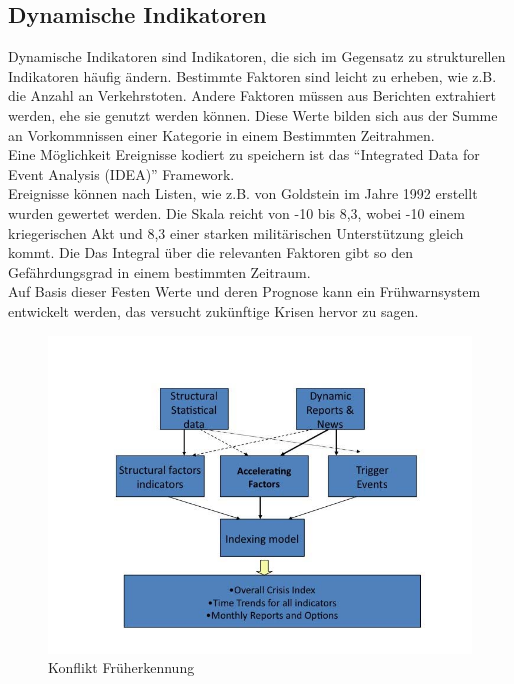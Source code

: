 \documentclass[twoside,a4paper]{article}
\begin{document}
\subsection{Dynamische Indikatoren}
Dynamische Indikatoren sind Indikatoren, die sich im Gegensatz zu strukturellen Indikatoren häufig ändern. Bestimmte Faktoren sind leicht zu erheben, wie z.B. die Anzahl an Verkehrstoten. Andere Faktoren müssen aus Berichten extrahiert werden, ehe sie genutzt werden können. Diese Werte bilden sich aus der Summe an Vorkommnissen einer Kategorie in einem Bestimmten Zeitrahmen.\\
Eine Möglichkeit Ereignisse kodiert zu speichern ist das \enquote{Integrated Data for Event Analysis (IDEA)} Framework\cite{idea}.\\
Ereignisse können nach Listen, wie z.B. von Goldstein\cite{goldstein} im Jahre 1992 erstellt wurden gewertet werden. Die Skala reicht von -10 bis 8,3, wobei -10 einem kriegerischen Akt und 8,3 einer starken militärischen Unterstützung gleich kommt. Die Das Integral über die relevanten Faktoren gibt so den Gefährdungsgrad in einem bestimmten Zeitraum.\\
Auf Basis dieser Festen Werte und deren Prognose kann ein Frühwarnsystem entwickelt werden, das versucht zukünftige Krisen hervor zu sagen.

\begin{figure}[H]
  \centering
  	\includegraphics[width=83.5truemm]{img/earlyWarning}
  \caption{Konflikt Früherkennung\cite{challanges_in_osint}}
  \label{img:earlyWarning}
\end{figure}
\end{document}
